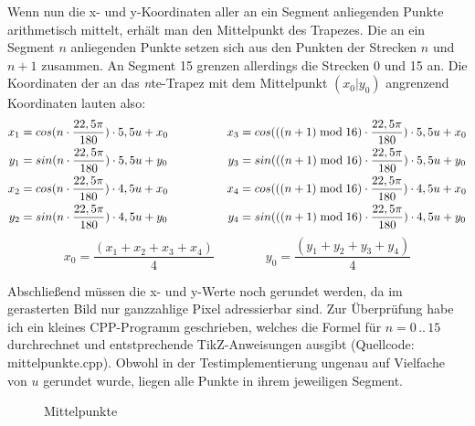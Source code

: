 Wenn nun die x- und y-Koordinaten aller an ein Segment anliegenden Punkte arithmetisch mittelt, erhält man den Mittelpunkt des Trapezes. Die an ein Segment \(n\) anliegenden Punkte setzen sich aus den Punkten der Strecken \(n\) und \(n+1\) zusammen. An Segment 15 grenzen allerdings die Strecken 0 und 15 an. 
Die Koordinaten der an das \textit{n}te-Trapez mit dem Mittelpunkt \((x_0|y_0)\) angrenzend Koordinaten lauten also:
\begin{gather}
	\begin{split}
		x_1 &= cos(n \cdot \frac{22,5\pi}{180}) \cdot 5,5u + x_0\\
		y_1 &= sin(n \cdot \frac{22,5\pi}{180}) \cdot 5,5u + y_0\\ \vspace{2em}
		x_2 &= cos(n \cdot \frac{22,5\pi}{180}) \cdot 4,5u + x_0\\
		y_2 &= sin(n \cdot \frac{22,5\pi}{180}) \cdot 4,5u + y_0
	\end{split}
	\hspace{5em}
	\begin{split}
		x_3 &= cos(((n+1)\bmod{}16) \cdot \frac{22,5\pi}{180}) \cdot 5,5u + x_0\\
		y_3 &= sin(((n+1)\bmod{}16) \cdot \frac{22,5\pi}{180}) \cdot 5,5u + y_0 \\ \vspace{2em}
		x_4 &= cos(((n+1)\bmod{}16) \cdot \frac{22,5\pi}{180}) \cdot 4,5u + x_0\\
		y_4 &= sin(((n+1)\bmod{}16) \cdot \frac{22,5\pi}{180}) \cdot 4,5u + y_0
	\end{split} \label{eq:nKoords}
\end{gather}
\begin{equation}
	x_0 = \frac{(x_1+x_2+x_3+x_4)}{4} \hspace{4em} y_0 = \frac{(y_1+y_2+y_3+y_4)}{4}
\end{equation}

Abschließend müssen die x- und y-Werte noch gerundet werden, da im gerasterten Bild nur ganzzahlige Pixel adressierbar sind.
Zur Überprüfung habe ich ein kleines CPP-Programm geschrieben, welches die Formel für \(n = 0\hspace{2pt}..\hspace{2pt}15 \) durchrechnet und entstprechende TikZ-Anweisungen ausgibt (Quellcode: mittelpunkte.cpp). Obwohl in der Testimplementierung ungenau auf Vielfache von \(u\) gerundet wurde, liegen alle Punkte in ihrem jeweiligen Segment.

\begin{figure}[!ht]
	\centering
	
	\caption{Mittelpunkte}
\end{figure}

